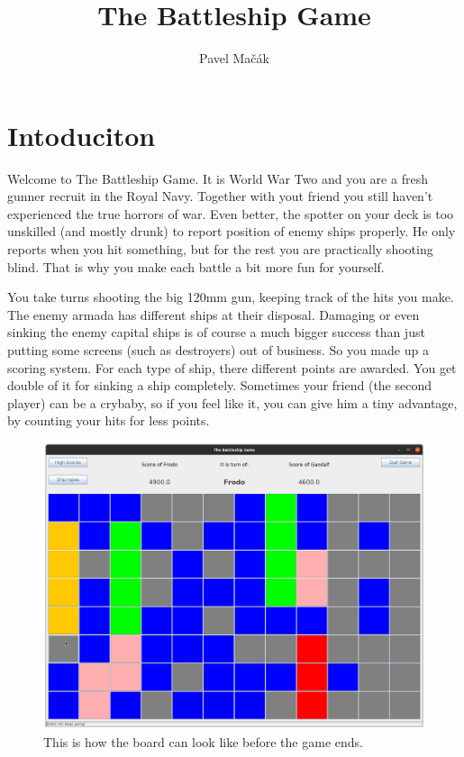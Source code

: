 \documentclass[]{article}
\title{The Battleship Game}
\author{Pavel Mačák}
\begin{document}
\maketitle

\section{Intoduciton}

Welcome to The Battleship Game. It is World War Two and you are a fresh gunner recruit in the Royal Navy. Together with yout friend you still haven't experienced the true horrors of war. Even better, the spotter on your deck is too unskilled (and mostly drunk) to report position of enemy ships properly. He only reports when you hit something, but for the rest you are practically shooting blind. That is why you make each battle a bit more fun for yourself.

You take turns shooting the big 120mm gun, keeping track of the hits you make. The enemy armada has different ships at their disposal. Damaging or even sinking the enemy capital ships is of course a much bigger success than just putting some screens (such as destroyers) out of business. So you made up a scoring system. For each type of ship, there different points are awarded. You get double of it for sinking a ship completely. Sometimes your friend (the second player) can be a crybaby, so if you feel like it, you can give him a tiny advantage, by counting your hits for less points.


\begin{figure}
	\centering
	\includegraphics[width=0.7\linewidth]{figs/boardScreen}
	\caption{This is how the board can look like before the game ends.}
	\label{fig:boardscreen}
\end{figure}
\end{document}

